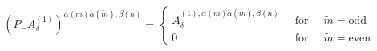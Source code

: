 \begin{equation}
\left(P_-A_\delta^{(1)}\right)^{\alpha(m)
\dot\alpha(\tilde m),\beta(n)}=\left\{\begin{array}{ccc}A_\delta^{(1),\alpha(m)
\dot\alpha(\tilde m),\beta(n)}\;\;&\mbox{for}&\;\;\tilde m=\mbox{odd}\\
0\;\;&\mbox{for}&\;\;\tilde m=\mbox{even}\end{array}\right.
\end{equation}

